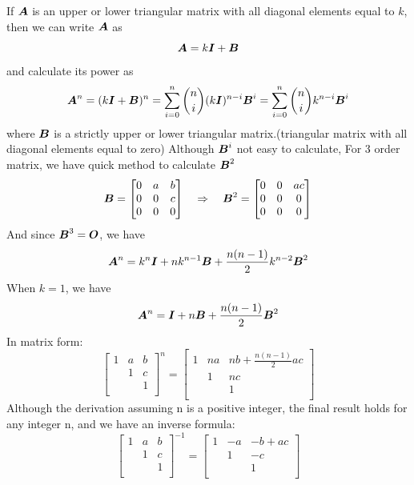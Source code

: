 \documentclass{overview}
\begin{document}
If $\boldsymbol{A}$ is an upper or lower triangular matrix with all diagonal elements equal to $k$,
then we can write $\boldsymbol{A}$ as
\[
	\boldsymbol{A} = k\boldsymbol{I} + \boldsymbol{B}
\]
and calculate its power as
\[
	\boldsymbol{A}^{n} = (k\boldsymbol{I} + \boldsymbol{B})^{n} =
	\sum_{i=0}^{n} \binom{n}{i} (k\boldsymbol{I})^{n-i} \boldsymbol{B}^{i} =
	\sum_{i=0}^{n} \binom{n}{i} k^{n-i} \boldsymbol{B}^{i}
\] 
where $\boldsymbol{B}$ is a strictly upper or lower triangular matrix.(triangular matrix 
with all diagonal elements equal to zero) Although $\boldsymbol{B}^{i}$ not easy to calculate,
For 3 order matrix, we have quick method to calculate $\boldsymbol{B}^{2}$
\[
	\boldsymbol{B} =
\begin{bmatrix}
	0 & a & b \\
	0 & 0 & c \\
	0 & 0 & 0 \\
\end{bmatrix}
\quad \Rightarrow \quad
\boldsymbol{B}^{2} =
\begin{bmatrix}
	0 & 0 & ac \\
	0 & 0 & 0 \\
	0 & 0 & 0 \\
\end{bmatrix}
\]
And since $\boldsymbol{B}^{3}=\boldsymbol{O}$, we have
\[
	\boldsymbol{A}^{n} = k^{n}\boldsymbol{I} + nk^{n-1}\boldsymbol{B} + \frac{n(n-1)}{2}k^{n-2}\boldsymbol{B}^{2}
\]
When $k=1$, we have
\[
	\boldsymbol{A}^{n} = \boldsymbol{I} + n\boldsymbol{B} + \frac{n(n-1)}{2}\boldsymbol{B}^{2}
\]
In matrix form:
\[
	\begin{bmatrix}
		1 & a & b \\
      & 1 & c \\
      &   & 1 \\
	\end{bmatrix}^{n} =
\begin{bmatrix}
	1 & na & nb + \frac{n(n-1)}{2} ac \\
			& 1 & nc \\
			&   & 1 \\
\end{bmatrix}
\] 
Although the derivation assuming n is a positive integer, the final result
holds for any integer n, and we have an inverse formula:
\[
	\begin{bmatrix}
		1 & a & b \\
      & 1 & c \\
      &   & 1 \\
	\end{bmatrix}^{-1} =
	\begin{bmatrix}
		1 & -a & - b +ac \\
			& 1 & -c \\
			&   & 1 \\
	\end{bmatrix}
\] 
\end{document}
